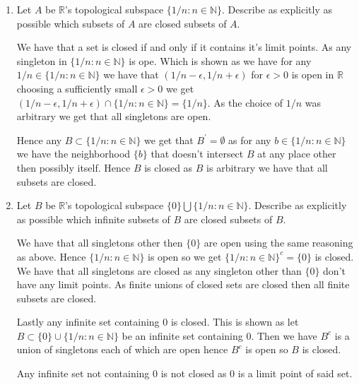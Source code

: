 \documentclass{amsart}
\theoremstyle{plain}
\theoremstyle{definition}
\theoremstyle{remark}
\begin{document}
\begin{enumerate}[label=(\alph*)]
    \item { Let $A$ be $\mathbb{R}$'s topological subspace $\{1/n: n\in \mathbb N\}$. Describe as explicitly as possible which subsets of $A$ are closed subsets of $A$.
        


    We have that a set is closed if and only if it contains it's limit points. As any singleton in $\{1/n: n\in \mathbb{N}\}$ is ope. Which is shown as we have for any $1/n\in \{1/n:n\in \mathbb{N}\}$ we have that $(1/n-\epsilon, 1/n+\epsilon)$ for $\epsilon >0$ is open in $\mathbb{R}$ choosing a sufficiently small $\epsilon>0$ we get $(1/n-\epsilon,1/n+\epsilon)\cap \{1/n:n\in \mathbb{N}\}=\{1/n\}$. As the choice of $1/n$ was arbitrary we get that all singletons are open.
    
    Hence any $B\subset \{1/n: n\in \mathbb N\}$ we get that $B^\prime=\emptyset$ as for any $b\in \{1/n:n\in \mathbb N\}$ we have the neighborhood $\{b\}$ that doesn't intersect $B$ at any place other then possibly itself. Hence $B$ is closed as $B$ is arbitrary we have that all subsets are closed. 
    }
    \item { Let $B$ be $\mathbb{R}$'s topological subspace $\{0\}\bigcup \{1/n: n\in \mathbb{N}\}$. Describe as explicitly as possible which infinite subsets of $B$ are closed subsets of $B$.
        
    
    
    We have that all singletons other then $\{0\}$ are open using the same reasoning as above. Hence $\{1/n: n\in \mathbb{N}\}$ is open so we get $\{1/n: n\in \mathbb{N}\}^c=\{0\}$ is closed. We have that all singletons are closed as any singleton other than $\{0\}$ don't have any limit points. As finite unions of closed sets are closed then all finite subsets are closed. 
    
    Lastly any infinite set containing $0$ is closed. This is shown as let $B\subset \{0\}\cup \{1/n:n\in \mathbb{N}\}$ be an infinite set containing $0$. Then we have $B^c$ is a union of singletons each of which are open hence $B^c$ is open so $B$ is closed. 
    
    Any infinite set not containing $0$ is not closed as $0$ is a limit point of said set. 
    }
\end{enumerate}
\end{document}
